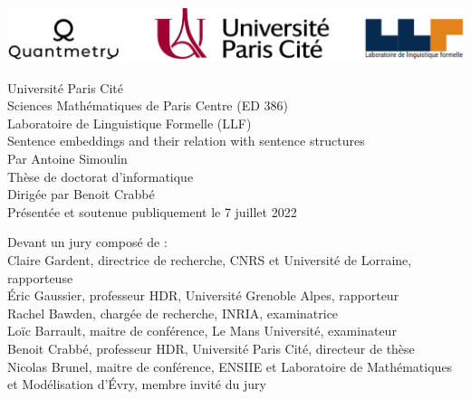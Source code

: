 \begin{titlepage}
\begin{center}
    {
    
    \includegraphics[width=14cm]{images/logos_3.png}
        
    \huge
    Université Paris Cité\\
    \large 
    Sciences Mathématiques de Paris Centre (ED 386)\\
    Laboratoire de Linguistique Formelle (LLF)\\[30pt]
    
    \Huge
    Sentence embeddings and their relation with sentence structures\\[56pt]
    
    \LARGE 
    \textmd{Par Antoine Simoulin\\[44pt]
    \Large
    Thèse de doctorat d’informatique\\[20pt]
    Dirigée par Benoit Crabbé \\[20pt]
    \large 
    Présentée et soutenue publiquement le 7 juillet 2022\\[20pt]}
    
    \vspace*{\fill}
    \raggedright\large 
    \textmd{Devant un jury composé de : \\[12pt]
    \normalsize
    Claire Gardent, directrice de recherche, CNRS et Université de Lorraine, rapporteuse\\
    Éric Gaussier, professeur HDR, Université Grenoble Alpes, rapporteur\\
    Rachel Bawden, chargée de recherche, INRIA, examinatrice\\
    Loïc Barrault, maitre de conférence, Le Mans Université, examinateur\\
    Benoit Crabbé, professeur HDR, Université Paris Cité, directeur de thèse\\
    Nicolas Brunel, maitre de conférence, ENSIIE et Laboratoire de Mathématiques et Modélisation d'Évry, membre invité du jury\\}
}
\end{center}
\end{titlepage}